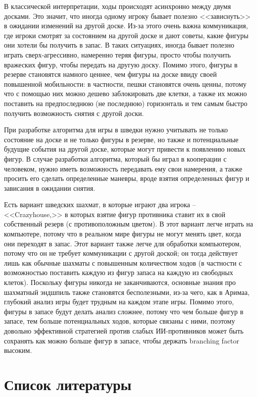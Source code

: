 \documentclass{article}
\begin{document}
В классической интерпретации, ходы происходят асинхронно между двумя досками.
Это значит, что иногда одному игроку бывает полезно <<зависнуть>>
в ожидании изменений на другой доске.
Из-за этого очень важна коммуникация, где игроки смотрят за состоянием на другой доске
и дают советы, какие фигуры они хотели бы получить в запас. 
В таких ситуациях, иногда бывает полезно играть сверх-агрессивно,
намеренно теряя фигуры,
просто чтобы получить вражеских фигур, чтобы передать на другую доску.
Помимо этого, фигуры в резерве становятся намного ценнее, чем фигуры на доске ввиду своей повышенной мобильности:
в частности, пешки становятся очень ценны,
потому что с помощью них можно дешево заблокировать две клетки,
а также их можно поставить на предпоследнюю (не последнюю) горизонталь и тем самым быстро получить возможность снятия с другой доски.

При разработке алгоритма для игры в шведки нужно учитывать не только состояние на доске
и не только фигуры в резерве,
но также и потенциальные будущие события на другой доске,
которые могут привести к появлению новых фигур.
В случае разработки алгоритма, который бы играл в кооперации с человеком,
нужно иметь возможность передавать ему свои намерения,
а также просить его сделать определенные маневры,
вроде взятия определенных фигур и зависания в ожидании снятия.

Есть вариант шведских шахмат, в которые играют два игрока -- <<Crazyhouse,>>
в которых взятие фигур противника ставит их в свой собственный резерв (с противоположным цветом).
В этот вариант легче играть на компьютере, потому что в реальном мире фигуры не могут менять цвет, когда они переходят в запас.
Этот вариант также легче для обработки компьютером, потому что он не требует
коммуникации с другой доской;
он тогда действует лишь как обычные шахматы с повышенным количеством ходов (в частности с возможностью поставить каждую из фигур запаса на каждую из свободных клеток).
Поскольку фигуры никогда не заканчиваются,
основные знания про шахматный эндшпиль также становятся бесполезными,
из-за чего, как в Аримаа, глубокий анализ игры будет трудным на каждом этапе игры.
Помимо этого, фигуры в запасе будут делать анализ сложнее,
потому что чем больше фигур в запасе, тем больше потенциальных ходов, которые связаны с ними,
поэтому довольно эффективной стратегией против слабых ИИ-противников может быть сохранять как можно больше фигур в запасе,
чтобы держать branching factor высоким.

\section{Список литературы}

\printbibliography
\end{document}
